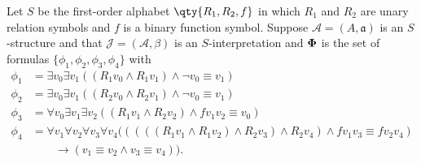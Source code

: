 \documentclass[boxes,pages,color=CornflowerBlue]{homework}
\begin{document}
\begin{problem}
Let $S$ be the first-order alphabet $\qty{R_1, R_2, f}$ in which $R_1$ and $R_2$ are unary relation symbols and $f$ is a binary function symbol.
Suppose $\mathcal{A} = (A, \mathfrak{a})$ is an $S$-structure and that $\mathcal{J} = (\mathcal{A}, \beta)$ is an $S$-interpretation and ${\bf \Phi}$ is the set of formulas $\{\phi_1, \phi_2, \phi_3, \phi_4\}$ with
\begin{align*}
    \phi_1 & = \exists v_0 \exists v_1 ((R_1 v_0 \wedge R_1 v_1)\wedge \neg v_0\equiv v_1)                                                            \\
    \phi_2 & = \exists v_0 \exists v_1 ((R_2 v_0 \wedge R_2 v_1)\wedge \neg v_0\equiv v_1)                                                            \\
    \phi_3 & = \forall v_0 \exists v_1 \exists v_2 ((R_1 v_1\wedge R_2 v_2)\wedge fv_1v_2\equiv v_0)                                                  \\
    \phi_4 & = \forall v_1 \forall v_2 \forall v_3 \forall v_4 (((((R_1v_1\wedge R_1 v_2)\wedge R_2 v_3)\wedge R_2 v_4)\wedge fv_1v_3 \equiv fv_2v_4) \\
           & \qquad \rightarrow (v_1\equiv v_2 \wedge v_3\equiv v_4)).
\end{align*}
\end{problem}
\end{document}

